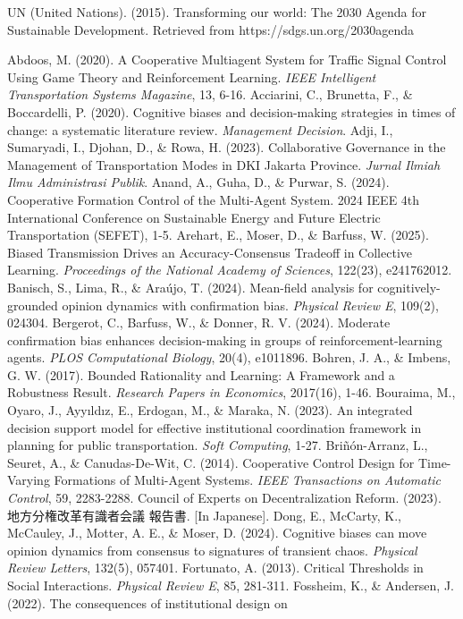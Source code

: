 UN (United Nations). (2015). Transforming our world: The 2030 Agenda for
Sustainable Development. Retrieved from https://sdgs.un.org/2030agenda

Abdoos, M. (2020). A Cooperative Multiagent System for Traffic Signal
Control Using Game Theory and Reinforcement Learning. \emph{IEEE
Intelligent Transportation Systems Magazine}, 13, 6-16. Acciarini, C.,
Brunetta, F., \& Boccardelli, P. (2020). Cognitive biases and
decision-making strategies in times of change: a systematic literature
review. \emph{Management Decision}. Adji, I., Sumaryadi, I., Djohan, D.,
\& Rowa, H. (2023). Collaborative Governance in the Management of
Transportation Modes in DKI Jakarta Province. \emph{Jurnal Ilmiah Ilmu
Administrasi Publik}. Anand, A., Guha, D., \& Purwar, S. (2024).
Cooperative Formation Control of the Multi-Agent System. 2024 IEEE 4th
International Conference on Sustainable Energy and Future Electric
Transportation (SEFET), 1-5. Arehart, E., Moser, D., \& Barfuss, W.
(2025). Biased Transmission Drives an Accuracy-Consensus Tradeoff in
Collective Learning. \emph{Proceedings of the National Academy of
Sciences}, 122(23), e241762012. Banisch, S., Lima, R., \& Araújo, T.
(2024). Mean-field analysis for cognitively-grounded opinion dynamics
with confirmation bias. \emph{Physical Review E}, 109(2), 024304.
Bergerot, C., Barfuss, W., \& Donner, R. V. (2024). Moderate
confirmation bias enhances decision-making in groups of
reinforcement-learning agents. \emph{PLOS Computational Biology}, 20(4),
e1011896. Bohren, J. A., \& Imbens, G. W. (2017). Bounded Rationality
and Learning: A Framework and a Robustness Result. \emph{Research Papers
in Economics}, 2017(16), 1-46. Bouraima, M., Oyaro, J., Ayyıldız, E.,
Erdogan, M., \& Maraka, N. (2023). An integrated decision support model
for effective institutional coordination framework in planning for
public transportation. \emph{Soft Computing}, 1-27. Briñón-Arranz, L.,
Seuret, A., \& Canudas-De-Wit, C. (2014). Cooperative Control Design for
Time-Varying Formations of Multi-Agent Systems. \emph{IEEE Transactions
on Automatic Control}, 59, 2283-2288. Council of Experts on
Decentralization Reform. (2023). 地方分権改革有識者会議 報告書. {[}In
Japanese{]}. Dong, E., McCarty, K., McCauley, J., Motter, A. E., \&
Moser, D. (2024). Cognitive biases can move opinion dynamics from
consensus to signatures of transient chaos. \emph{Physical Review
Letters}, 132(5), 057401. Fortunato, A. (2013). Critical Thresholds in
Social Interactions. \emph{Physical Review E}, 85, 281-311. Fossheim,
K., \& Andersen, J. (2022). The consequences of institutional design on
